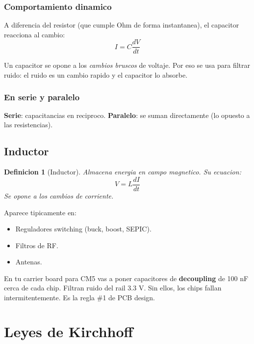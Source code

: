 \documentclass[11pt,a4paper,oneside,openright]{book}
\newtheorem{definicion}{Definicion}[chapter]
\begin{document}
\subsection{Comportamiento dinamico}

A diferencia del resistor (que cumple Ohm de forma instantanea), el
capacitor reacciona al cambio:
\begin{equation}
I = C \frac{dV}{dt}
\end{equation}

\begin{intuibox}
Un capacitor se opone a los \emph{cambios bruscos} de voltaje. Por eso se
usa para filtrar ruido: el ruido es un cambio rapido y el capacitor lo
absorbe.
\end{intuibox}

\subsection{En serie y paralelo}

\textbf{Serie}: capacitancias en reciproco.
\textbf{Paralelo}: se suman directamente (lo opuesto a las resistencias).

\section{Inductor}

\begin{definicion}[Inductor]
Almacena energia en campo magnetico. Su ecuacion:
\begin{equation}
V = L \frac{dI}{dt}
\end{equation}
Se opone a los cambios de \emph{corriente}.
\end{definicion}

Aparece tipicamente en:
\begin{itemize}[leftmargin=2em]
  \item Reguladores switching (buck, boost, SEPIC).
  \item Filtros de RF.
  \item Antenas.
\end{itemize}

\begin{payload}
En tu carrier board para CM5 vas a poner capacitores de \textbf{decoupling}
de 100 nF cerca de cada chip. Filtran ruido del rail 3.3 V. Sin ellos,
los chips fallan intermitentemente. Es la regla \#1 de PCB design.
\end{payload}

\chapter{Leyes de Kirchhoff}
\end{document}
